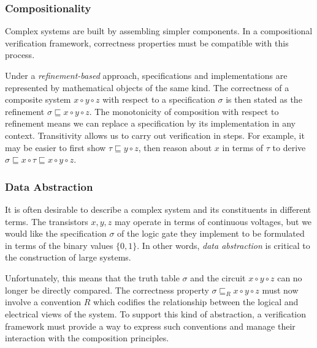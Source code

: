 \documentclass[acmsmall,screen,review,anonymous]{acmart}
\begin{document}
\subsubsection{Compositionality} \label{sec:req:comp} %

Complex systems are built by assembling simpler components.
In a compositional verification framework,
correctness properties must be compatible with this process.

Under a \emph{refinement-based} approach,
specifications and implementations
are represented by mathematical objects of the same kind.
The correctness of a composite system $x \circ y \circ z$
with respect to a specification $\sigma$
is then stated as the refinement
$\sigma \sqsubseteq x \circ y \circ z$.
The monotonicity of composition
with respect to refinement
means we can replace a specification by its implementation
in any context.
Transitivity
allows us to carry out verification in steps.
For example,
it may be easier to first show
$\tau \sqsubseteq y \circ z$,
then reason about $x$ in terms of $\tau$ %
to derive
$\sigma \sqsubseteq x \circ \tau \sqsubseteq x \circ y \circ z$.


\subsubsection{Data Abstraction} \label{sec:req:abs} %

It is often desirable to describe a complex system
and its constituents in different terms.
The transistors $x, y, z$ may operate in terms of continuous voltages,
but we would like the specification $\sigma$
of the logic gate they implement
to be formulated in terms of the binary values $\{0, 1\}$.
In other words,
\emph{data abstraction} is critical to the construction of large systems.

Unfortunately,
this means that the truth table $\sigma$
and the circuit $x \circ y \circ z$
can no longer be directly compared.
The correctness property $\sigma \sqsubseteq_R x \circ y \circ z$
must now involve a convention $R$
which codifies the relationship between
the logical and electrical views of the system.
To support this kind of abstraction,
a verification framework must provide a way to express
such conventions
and manage their interaction with the composition principles.
\end{document}
